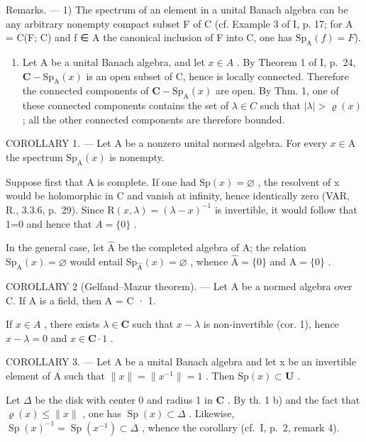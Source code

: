 Remarks. --- 1) The spectrum of an element in a unital Banach algebra can be any arbitrary nonempty compact subset F of C (cf. Example 3 of I, p. 17; for A = C(F; C) and f ∈ A the canonical inclusion of F into C, one has \(\mathrm{Sp}_{\mathrm{A}}(f) = F\)).

\begin{enumerate}
\def\labelenumi{\arabic{enumi})}
\setcounter{enumi}{1}
\tightlist
\item
  Let A be a unital Banach algebra, and let \(x \in A\) . By Theorem 1 of I, p.~24, \(\mathbf{C} - \mathrm{Sp}_{\mathrm{A}}(x)\) is an open subset of C, hence is locally connected. Therefore the connected components of \(\mathbf{C} - \mathrm{Sp}_{\mathrm{A}}(x)\) are open. By Thm. 1, one of these connected components contains the set of \(\lambda \in C\) such that \(|\lambda| > \varrho(x)\) ; all the other connected components are therefore bounded.
\end{enumerate}

COROLLARY 1. --- Let A be a nonzero unital normed algebra. For every \(x \in \mathrm{A}\) the spectrum \(\mathrm{Sp}_{\mathrm{A}}(x)\) is nonempty.

Suppose first that A is complete. If one had \(\mathrm{Sp}(x)=\varnothing\) , the resolvent of x would be holomorphic in C and vanish at infinity, hence identically zero (VAR, R., 3.3.6, p.~29). Since \(\mathrm{R}(x,\lambda)=(\lambda-x)^{-1}\) is invertible, it would follow that 1=0 and hence that \(A=\{0\}\) .

In the general case, let \(\widehat{\mathrm{A}}\) be the completed algebra of A; the relation \(\mathrm{Sp}_{\mathrm{A}}(x) = \varnothing\) would entail \(\mathrm{Sp}_{\widehat{\mathrm{A}}} (x) = \varnothing\) , whence \(\widehat{\mathrm{A}} = \{0\}\) and \(\mathrm{A} = \{0\}\) .

COROLLARY 2 (Gelfand–Mazur theorem). --- Let A be a normed algebra over C. If A is a field, then A = C · 1.

If \(x \in A\) , there exists \(\lambda \in \mathbf{C}\) such that \(x - \lambda\) is non-invertible (cor. 1), hence \(x - \lambda = 0\) and \(x \in \mathbf{C} \cdot 1\) .

COROLLARY 3. --- Let A be a unital Banach algebra and let x be an invertible element of A such that \(\|x\|=\|x^{-1}\|=1\) . Then \(\mathrm{Sp}(x)\subset\mathbf{U}\) .

Let \(\Delta\) be the disk with center 0 and radius 1 in \(\mathbf{C}\) . By th. 1 b) and the fact that \(\varrho(x) \leqslant \|x\|\) , one has \(\operatorname{Sp}(x) \subset \Delta\) . Likewise, \(\operatorname{Sp}(x)^{-1} = \operatorname{Sp}(x^{-1}) \subset \Delta\) , whence the corollary (cf.~I, p.~2, remark 4).

